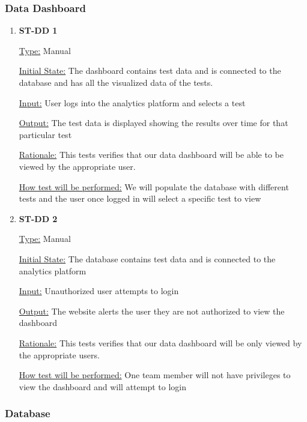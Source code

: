\documentclass[12pt, titlepage]{article}
\begin{document}
\subsubsection{Data Dashboard}
\begin{enumerate}
  \item{\bf{ST-DD 1}}
  
  \underline{Type:} Manual
            
  \underline{Initial State:} The dashboard contains test data and is connected to the database and has all the visualized data of the tests.
            
  \underline{Input:} User logs into the analytics platform and selects a test
            
  \underline{Output:} The test data is displayed showing the results over time for that particular test
  
  \underline{Rationale:} This tests verifies that our data dashboard will be able to be viewed by the appropriate user.
            
  \underline{How test will be performed:} We will populate the database with different tests and the user once logged in will select a specific test to view\\

  \item{\bf{ST-DD 2}}
  
  \underline{Type:} Manual
            
  \underline{Initial State:} The database contains test data and is connected to the analytics platform
            
  \underline{Input:} Unauthorized user attempts to login
            
  \underline{Output:} The website alerts the user they are not authorized to view the dashboard
  
  \underline{Rationale:} This tests verifies that our data dashboard will be only viewed by the appropriate users.
            
  \underline{How test will be performed:} One team member will not have privileges to view the dashboard and will attempt to login\\

\end{enumerate}

\subsubsection{Database}
\end{document}
